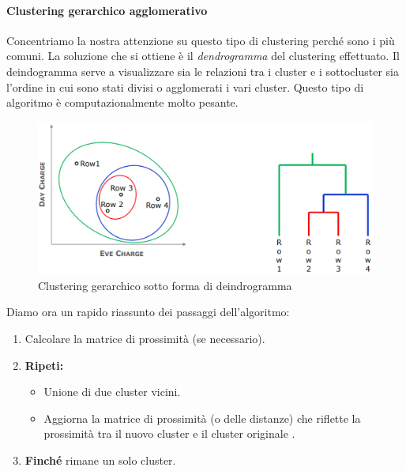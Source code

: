 \paragraph{Clustering gerarchico agglomerativo} Concentriamo la nostra attenzione su questo tipo di clustering perché sono i più comuni. 
La soluzione che si ottiene è il \textit{dendrogramma} del clustering effettuato. Il deindogramma serve a visualizzare sia le relazioni tra i cluster e i sottocluster sia l'ordine in cui sono stati divisi o agglomerati i vari cluster. Questo tipo di algoritmo è computazionalmente molto pesante.

\begin{figure}[H]
	\centering
	\includegraphics[height=0.25 \linewidth]{clustering/pict/cluster_aggl.png}
	\caption{Clustering gerarchico sotto forma di deindrogramma}
\end{figure}

Diamo ora un rapido riassunto dei passaggi dell'algoritmo:

\begin{enumerate}
	\item Calcolare la matrice di prossimità (se necessario).
	\item \textbf{Ripeti:}
	\begin{itemize}
		\item Unione di due cluster vicini.
		\item Aggiorna la matrice di prossimità (o delle distanze) che riflette la prossimità tra il nuovo cluster e il cluster originale		.
	\end{itemize}
	\item \textbf{Finché} rimane un solo cluster.
\end{enumerate}

